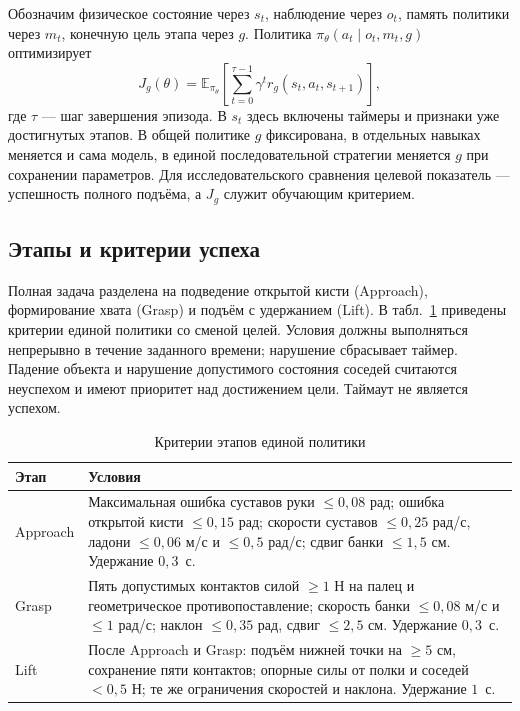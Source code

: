 \documentclass{misisarticle}
\begin{document}
Обозначим физическое состояние через $s_t$, наблюдение через $o_t$, память политики через $m_t$, конечную цель этапа через $g$. Политика $\pi_\theta(a_t\mid o_t,m_t,g)$ оптимизирует
\begin{equation}
 J_g(\theta)=\mathbb{E}_{\pi_\theta}\!\left[\sum_{t=0}^{\tau-1}\gamma^t r_g(s_t,a_t,s_{t+1})\right],
\end{equation}
где $\tau$ --- шаг завершения эпизода. В $s_t$ здесь включены таймеры и признаки уже достигнутых этапов. В общей политике $g$ фиксирована, в отдельных навыках меняется и сама модель, в единой последовательной стратегии меняется $g$ при сохранении параметров. Для исследовательского сравнения целевой показатель --- успешность полного подъёма, а $J_g$ служит обучающим критерием.

\subsection{Этапы и критерии успеха}
Полная задача разделена на подведение открытой кисти (Approach), формирование хвата (Grasp) и подъём с удержанием (Lift). В табл.~\ref{tab:gates} приведены критерии единой политики со сменой целей. Условия должны выполняться непрерывно в течение заданного времени; нарушение сбрасывает таймер. Падение объекта и нарушение допустимого состояния соседей считаются неуспехом и имеют приоритет над достижением цели. Таймаут не является успехом.

\begin{table}[tb]
\caption{Критерии этапов единой политики}
\label{tab:gates}
\centering\small
\begin{tabular}{@{}p{}p{}@{}}
\toprule
Этап & Условия \\
\midrule
Approach & Максимальная ошибка суставов руки $\leq0{,}08$ рад; ошибка открытой кисти $\leq0{,}15$ рад; скорости суставов $\leq0{,}25$ рад/с, ладони $\leq0{,}06$ м/с и $\leq0{,}5$ рад/с; сдвиг банки $\leq1{,}5$ см. Удержание $0{,}3$~с. \\
\addlinespace
Grasp & Пять допустимых контактов силой $\geq1$ Н на палец и геометрическое противопоставление; скорость банки $\leq0{,}08$ м/с и $\leq1$ рад/с; наклон $\leq0{,}35$ рад, сдвиг $\leq2{,}5$ см. Удержание $0{,}3$~с. \\
\addlinespace
Lift & После Approach и Grasp: подъём нижней точки на $\geq5$ см, сохранение пяти контактов; опорные силы от полки и соседей $<0{,}5$ Н; те же ограничения скоростей и наклона. Удержание $1$~с. \\
\bottomrule
\end{tabular}
\end{table}
\end{document}
